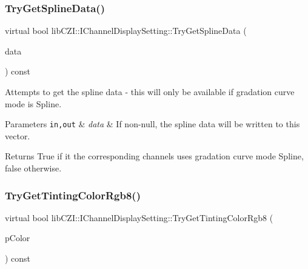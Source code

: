 \subsubsection{\texorpdfstring{Try\+Get\+Spline\+Data()}{TryGetSplineData()}}
{\footnotesize\ttfamily virtual bool lib\+C\+Z\+I\+::\+I\+Channel\+Display\+Setting\+::\+Try\+Get\+Spline\+Data (\begin{DoxyParamCaption}\item[{std\+::vector$<$ \hyperlink{structlib_c_z_i_1_1_i_display_settings_1_1_spline_data}{lib\+C\+Z\+I\+::\+I\+Display\+Settings\+::\+Spline\+Data} $>$ $\ast$}]{data }\end{DoxyParamCaption}) const\hspace{0.3cm}{\ttfamily [pure virtual]}}

Attempts to get the spline data -\/ this will only be available if gradation curve mode is {\ttfamily Spline}.


\begin{DoxyParams}[1]{Parameters}
\mbox{\tt in,out}  & {\em data} & If non-\/null, the spline data will be written to this vector.\\
\hline
\end{DoxyParams}
\begin{DoxyReturn}{Returns}
True if it the corresponding channels uses gradation curve mode {\ttfamily Spline}, false otherwise. 
\end{DoxyReturn}
\mbox{\label{classlib_c_z_i_1_1_i_channel_display_setting_a7fd49b4a914738b4640eedef351cdd02}} 
\subsubsection{\texorpdfstring{Try\+Get\+Tinting\+Color\+Rgb8()}{TryGetTintingColorRgb8()}}
{\footnotesize\ttfamily virtual bool lib\+C\+Z\+I\+::\+I\+Channel\+Display\+Setting\+::\+Try\+Get\+Tinting\+Color\+Rgb8 (\begin{DoxyParamCaption}\item[{\hyperlink{structlib_c_z_i_1_1_rgb8_color}{lib\+C\+Z\+I\+::\+Rgb8\+Color} $\ast$}]{p\+Color }\end{DoxyParamCaption}) const\hspace{0.3cm}{\ttfamily [pure virtual]}}

